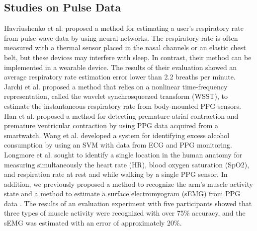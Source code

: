 \documentclass[sigchi,authordraft]{acmart}
\begin{document}
\subsection{Studies on Pulse Data}
Havriushenko et al. \cite{respiratory_rate_estimation1} proposed a method for estimating a user's respiratory rate from pulse wave data by using neural networks. The respiratory rate is often measured with a thermal sensor placed in the nasal channels or an elastic chest belt, but these devices may interfere with sleep. In contrast, their method can be implemented in a wearable device. The results of their evaluation showed an average respiratory rate estimation error lower than 2.2 breaths per minute. Jarchi et al. \cite{respiratory_rate_estimation2} proposed a method that relies on a nonlinear time-frequency representation, called the wavelet synchrosqueezed transform (WSST), to estimate the instantaneous respiratory rate from body-mounted PPG sensors. Han et al. \cite{arrhythmia_detection} proposed a method for detecting premature atrial contraction and premature ventricular contraction by using PPG data acquired from a smartwatch. Wang et al. \cite{alcohol_detection} developed a system for identifying excess alcohol consumption by using an SVM with data from ECG and PPG monitoring. Longmore et al. \cite{ppg_location} sought to identify a single location in the human anatomy for measuring simultaneously the heart rate (HR), blood oxygen saturation (SpO2), and respiration rate at rest and while walking by a single PPG sensor. In addition, we previously proposed a method to recognize the arm's muscle activity state and a method to estimate a surface electromyogram (sEMG) from PPG data \cite{semg_okamoto}. The results of an evaluation experiment with five participants showed that three types of muscle activity were recognized with over 75\% accuracy, and the sEMG was estimated with an error of approximately 20\%.\par
\end{document}
